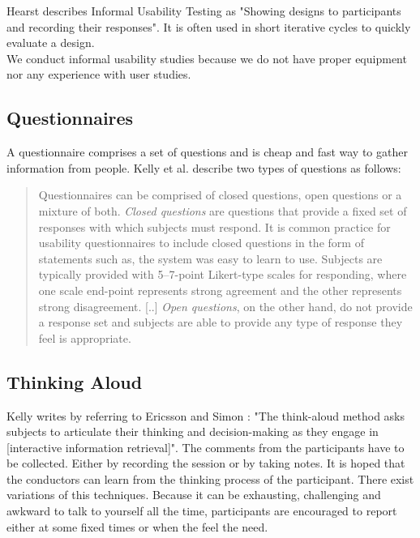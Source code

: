\documentclass[11pt]{report}
\begin{document}
Hearst \cite{Hearst2009} describes Informal Usability Testing as "Showing designs to participants and recording their responses". It is often used in short iterative cycles to quickly evaluate a design. \\

 We conduct informal usability studies because we do not have proper equipment nor any experience with user studies.

\subsection{Questionnaires}

A questionnaire comprises a set of questions and is cheap and fast way to gather information from people. Kelly et al. \cite{Kelly2008} describe two types of questions as follows:

\begin{quote}
	Questionnaires can be comprised of closed questions, open questions or a mixture of both. \textit{Closed questions} are questions that provide a fixed set of responses with which subjects must respond. It is common practice for usability questionnaires to include closed questions in the form of statements such as, the system was easy to learn to use. Subjects are typically provided with 5–7-point Likert-type scales for responding, where one scale end-point represents strong agreement and the other represents strong disagreement. [..] \textit{Open questions}, on the other hand, do not provide a response set and subjects are able to provide any type of response they feel is appropriate. 
	\end{quote}


\subsection{Thinking Aloud}

Kelly \cite{Kelly2007} writes by referring to Ericsson and Simon \cite{Ericsson1993}: "The think-aloud method asks subjects to articulate their thinking and decision-making as they engage in [interactive information retrieval]". The comments from the participants have to be collected. Either by recording the session or by taking notes. It is hoped that the conductors can learn from the thinking process of the participant. There exist variations of this techniques. Because it can be exhausting, challenging and awkward to talk to yourself all the time, participants are encouraged to report either at some fixed times or when the feel the need.
\end{document}
